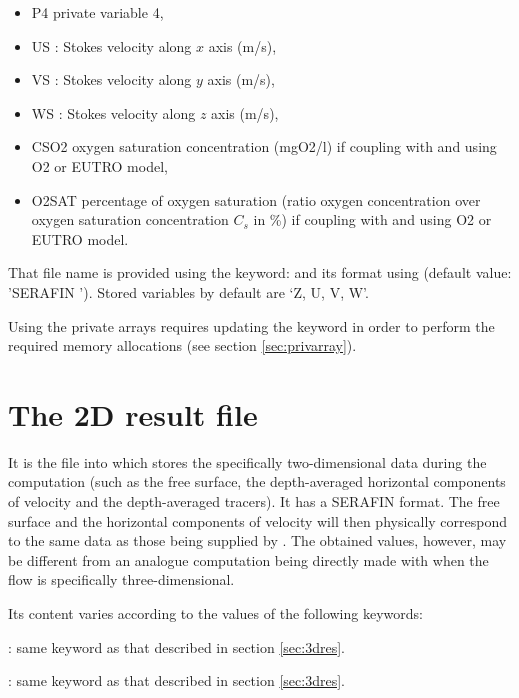 \begin{itemize}
\item P4 private variable 4,

\item US : Stokes velocity along $x$ axis (m/s),

\item VS : Stokes velocity along $y$ axis (m/s),

\item WS : Stokes velocity along $z$ axis (m/s),

\item CSO2 oxygen saturation concentration (mgO2/l) if coupling with \waqtel
and using O2 or EUTRO model,

\item O2SAT percentage of oxygen saturation (ratio oxygen concentration over
oxygen saturation concentration $C_s$ in \%) if coupling with \waqtel and using
O2 or EUTRO model.
\end{itemize}

That file name is provided using the keyword:  and its
format using  (default value: 'SERAFIN '). Stored
variables by default are `Z, U, V, W'.

Using the private arrays requires updating the keyword  in order to perform the required memory allocations (see
section \ref{sec:privarray}).

\section{The 2D result file}

It is the file into which  stores the specifically two-dimensional
data during the computation (such as the free surface, the depth-averaged
horizontal components of velocity and the depth-averaged tracers). It has a
SERAFIN format. The free surface and the horizontal components of velocity will
then physically correspond to the same data as those being supplied by
. The obtained values, however, may be different from an analogue
computation being directly made with  when the flow is specifically
three-dimensional.

Its content varies according to the values of the following keywords:

: same keyword as that
described in section \ref{sec:3dres}.

: same keyword as that described in section
\ref{sec:3dres}.

